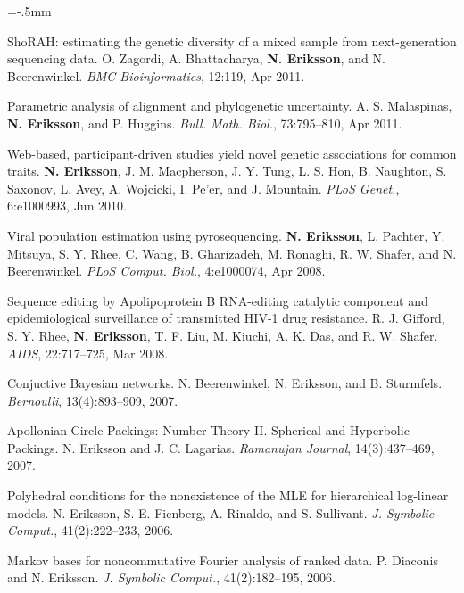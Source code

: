\documentclass[11pt]{article}
\newenvironment{papers}[1][1]
	{\vspace{-2ex}\leftmargini=16.1mm%
	 \begin{revnumerate}[{#1}]\itemsep=-.5mm}
	{\end{revnumerate}\vspace{-2ex}}
\def\paper{\item}
\def\paperyear#1{\item[\addtocounter{enumi}{-1}%
		 {\makebox[0mm][r]{\makebox[14mm]{#1\hfill\arabic{enumi}.}}}]}
\begin{document}
\begin{papers}[25]
            \paper
        ShoRAH: estimating the genetic diversity of a mixed sample from next-generation sequencing data.
        O. Zagordi, A. Bhattacharya, \textbf{N. Eriksson}, and N. Beerenwinkel.
        \textit{BMC Bioinformatics}, 12:119, Apr 2011.

            \paper
        Parametric analysis of alignment and phylogenetic uncertainty.
        A. S. Malaspinas, \textbf{N. Eriksson}, and P. Huggins.
        \textit{Bull. Math. Biol.}, 73:795--810, Apr 2011.

     
                \paperyear{2010}
        Web-based, participant-driven studies yield novel genetic associations for common traits.
        \textbf{N. Eriksson}, J. M. Macpherson, J. Y. Tung, L. S. Hon, B. Naughton, S. Saxonov, L. Avey, A. Wojcicki, I. Pe'er, and J. Mountain.
        \textit{PLoS Genet.}, 6:e1000993, Jun 2010.

     
                \paperyear{2008}
        Viral population estimation using pyrosequencing.
        \textbf{N. Eriksson}, L. Pachter, Y. Mitsuya, S. Y. Rhee, C. Wang, B. Gharizadeh, M. Ronaghi, R. W. Shafer, and N. Beerenwinkel.
        \textit{PLoS Comput. Biol.}, 4:e1000074, Apr 2008.

            \paper
        Sequence editing by Apolipoprotein B RNA-editing catalytic component and epidemiological surveillance of transmitted HIV-1 drug resistance.
        R. J. Gifford, S. Y. Rhee, \textbf{N. Eriksson}, T. F. Liu, M. Kiuchi, A. K. Das, and R. W. Shafer.
        \textit{AIDS}, 22:717--725, Mar 2008.

     
                \paperyear{2007}
        Conjuctive Bayesian networks.
        N. Beerenwinkel, N. Eriksson, and B. Sturmfels.
        \textit{Bernoulli}, 13(4):893--909, 2007.

            \paper
        Apollonian Circle Packings: Number Theory II. Spherical and Hyperbolic Packings.
        N. Eriksson and J. C. Lagarias.
        \textit{Ramanujan Journal}, 14(3):437--469, 2007.

     
                \paperyear{2006}
        Polyhedral conditions for the nonexistence of the MLE for hierarchical log-linear models.
        N. Eriksson, S. E. Fienberg, A. Rinaldo, and S. Sullivant.
        \textit{J. Symbolic Comput.}, 41(2):222--233, 2006.

            \paper
        Markov bases for noncommutative Fourier analysis of ranked data.
        P. Diaconis and N. Eriksson.
        \textit{J. Symbolic Comput.}, 41(2):182--195, 2006.


\end{papers}
\end{document}
